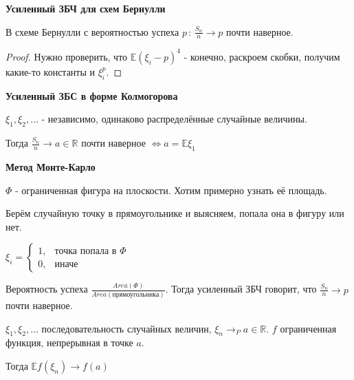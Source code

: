 \begin{consequence}
    \textbf{Усиленный ЗБЧ для схем Бернулли}

    В схеме Бернулли с вероятностью успеха $p \, : \, \frac{S_n}{n} \rightarrow p$ почти наверное.
\end{consequence}

\begin{proof}
    Нужно проверить, что $\mathbb{E}(\xi_i - p)^4$ - конечно, раскроем скобки, получим какие-то константы и $\xi_i^p$.
\end{proof}

\begin{theorem}
    \textbf{Усиленный ЗБС в форме Колмогорова}

    $\xi_1, \xi_2, \ldots$ - независимо, одинаково распределённые случайные величины.

    Тогда $\frac{S_n}{n} \rightarrow a \in \mathbb{R}$ почти наверное $\Leftrightarrow a = \mathbb{E}\xi_1$
\end{theorem}


\textbf{Метод Монте-Карло}

$\Phi$ - ограниченная фигура на плоскости. Хотим примерно узнать её площадь.

Берём случайную точку в прямоугольнике и выясняем, попала она в фигуру или нет.

$
\xi_i = 
\begin{cases}
    1, & \text{точка попала в $\Phi$} \\
    0, & \text{иначе}
\end{cases}
$

Вероятность успеха $\frac{Area(\Phi)}{Area(\text{прямоугольника})}$. Тогда усиленный ЗБЧ
говорит, что $\frac{S_n}{n} \rightarrow p$ почти наверное.

\begin{theorem}
    $\xi_1, \xi_2, \ldots$ последовательность случайных величин, $\xi_n \rightarrow_P a \in \mathbb{R}$.
    $f$ ограниченная функция, непрерывная в точке $a$.

    Тогда $\mathbb{E}f(\xi_n) \rightarrow f(a)$
\end{theorem}

